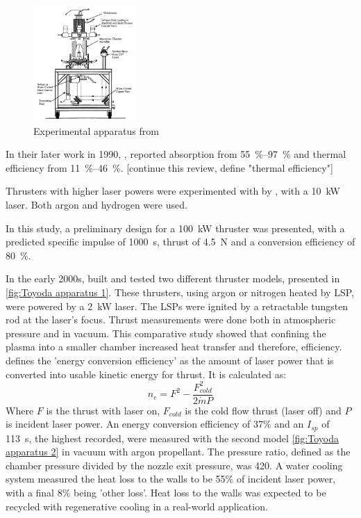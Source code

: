         \begin{figure}[h!]
            \centering
            \includegraphics[width=0.35\textwidth]{assets/2 background/Illinois (Krier) Apparatus.png}
            \caption{Experimental apparatus from \textcite{zerkleLasersustainedArgonPlasmas1990}}
            \label{fig:Krier apparatus}
        \end{figure}

        In their later work in 1990, \textcite{zerkleLasersustainedArgonPlasmas1990}, reported absorption from \qtyrange{55}{97}{\%} and thermal efficiency from \qtyrange{11}{46}{\%}. [continue this review, define "thermal efficiency"]

        Thrusters with higher laser powers were experimented with by \textcite{blackLaserPropulsion10kW1995}, with a \qty{10}{kW}  laser. Both argon and hydrogen were used.

        In this study, a preliminary design for a \qty{100}{kW} thruster was presented, with a predicted specific impulse of \qty{1000}{s}, thrust of \qty{4.5}{N} and a conversion efficiency of \qty{80}{\%}.


        In the early 2000s, \textcite{toyodaThrustPerformanceCW2002} built and tested two different thruster models, presented in \autoref{fig:Toyoda apparatus 1}. These thrusters, using argon or nitrogen heated by LSP, were powered by a \qty{2}{kW}  laser. The LSPs were ignited by a retractable tungsten rod at the laser's focus. Thrust measurements were done both in atmospheric pressure and in vacuum. This comparative study showed that confining the plasma into a smaller chamber increased heat transfer and therefore, efficiency. \textcite{toyodaThrustPerformanceCW2002} defines the 'energy conversion efficiency' as the amount of laser power that is converted into usable kinetic energy for thrust. It is calculated as:
        \[ n_e = F^2 - \frac{F^2_{cold}}{2 \dot{m} P}\]
        Where $F$ is the thrust with laser on, $F_{cold}$ is the cold flow thrust (laser off) and $P$ is incident laser power. An energy conversion efficiency of 37\% and an $I_{sp}$ of \qty{113}{s}, the highest recorded, were measured with the second model \autoref{fig:Toyoda apparatus 2} in vacuum with argon propellant. The pressure ratio, defined as the chamber pressure divided by the nozzle exit pressure, was 420. A water cooling system measured the heat loss to the walls to be 55\% of incident laser power, with a final 8\% being 'other loss'. Heat loss to the walls was expected to be recycled with regenerative cooling in a real-world application.

